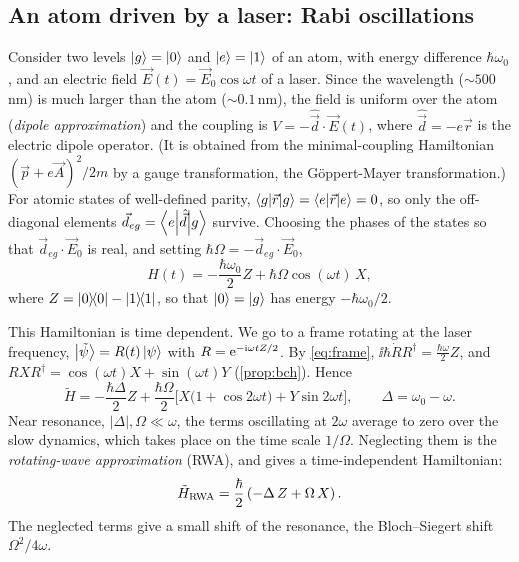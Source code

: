 \subsection{An atom driven by a laser: Rabi oscillations}\label{sec:rabi}
\begin{origin}
Consider two levels $\left|g\right\rangle=\left|0\right\rangle$ and $\left|e\right\rangle=\left|1\right\rangle$ of an atom, with energy difference $\hbar\omega_0$, and an electric field
$\vec E(t)=\vec E_0\cos\omega t$ of a laser. Since the wavelength (${\sim}500$\,nm) is much larger than the atom (${\sim}0.1$\,nm), the field is
uniform over the atom (\emph{dipole approximation}) and the coupling is $V=-\hat{\vec d}\cdot\vec E(t)$, where $\hat{\vec d}=-e\hat{\vec r}$ is the
electric dipole operator. (It is obtained from the minimal-coupling Hamiltonian $(\vec p+e\vec A)^2/2m$ by a gauge transformation, the
Göppert-Mayer transformation.) For atomic states of well-defined parity, $\left\langle g\middle|\vec r\middle|g\right\rangle=\left\langle e\middle|\vec r\middle|e\right\rangle=0$, so only the off-diagonal elements
$\vec d_{eg}=\left\langle e\middle|\hat{\vec d}\middle|g\right\rangle$ survive. Choosing the phases of the states so that $\vec d_{eg}\cdot\vec E_0$ is real, and setting
$\hbar\Omega=-\vec d_{eg}\cdot\vec E_0$,
\begin{equation}\label{eq:Hdriven}
  H(t)=-\frac{\hbar\omega_0}2Z+\hbar\Omega\cos(\omega t)\,X,
\end{equation}
where $Z=\left|0\middle\rangle\!\middle\langle0\right|-\left|1\middle\rangle\!\middle\langle1\right|$, so that $\left|0\right\rangle=\left|g\right\rangle$ has energy $-\hbar\omega_0/2$.

This Hamiltonian is time dependent. We go to a frame rotating at the laser frequency, $\left|\tilde\psi\right\rangle=R(t)\left|\psi\right\rangle$ with
$R=\mathrm e^{-\mathrm i\omega tZ/2}$. By \cref{eq:frame}, $\ii\hbar\dot RR^\dagger=\frac{\hbar\omega}2Z$, and
$RXR^\dagger=\cos(\omega t)X+\sin(\omega t)Y$ (\cref{prop:bch}). Hence
\begin{equation}
  \tilde H=-\frac{\hbar\Delta}2Z+\frac{\hbar\Omega}2\Big[X\big(1+\cos2\omega t\big)+Y\sin2\omega t\Big],\qquad\Delta=\omega_0-\omega.
\end{equation}
Near resonance, $|\Delta|,\Omega\ll\omega$, the terms oscillating at $2\omega$ average to zero over the slow dynamics, which takes place on the
time scale $1/\Omega$. Neglecting them is the \emph{rotating-wave approximation} (RWA), and gives a time-independent Hamiltonian:
\begin{equation}\label{eq:HRWA}
  \tilde H_{\rm RWA}=\frac\hbar2\left(-\Delta\,Z+\Omega\,X\right).
\end{equation}
The neglected terms give a small shift of the resonance, the Bloch--Siegert shift $\Omega^2/4\omega$.
\end{origin}

